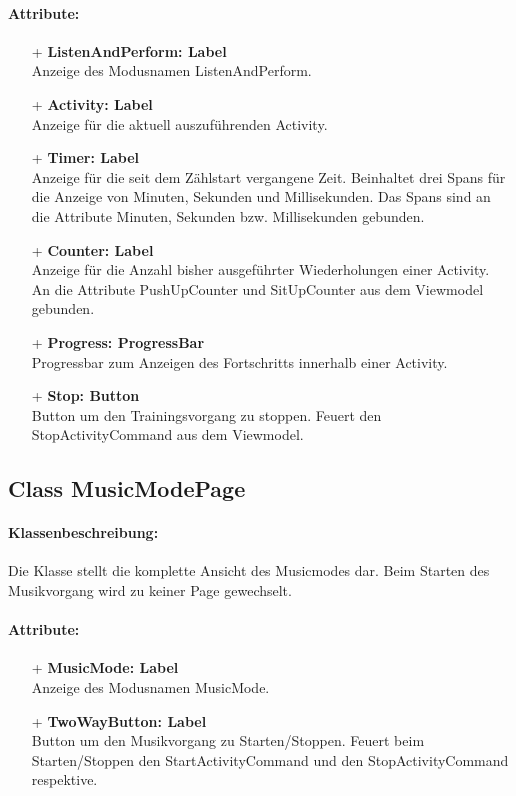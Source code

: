 \documentclass[a4paper,12pt]{article}
\begin{document}
\paragraph{Attribute:}
	\begin{itemize}
	\item[+] \textbf{ListenAndPerform: Label} \\ Anzeige des Modusnamen ListenAndPerform.
	\item[+] \textbf{Activity: Label} \\ Anzeige für die aktuell auszuführenden Activity.
	\item[+] \textbf{Timer: Label} \\ Anzeige für die seit dem Zählstart vergangene Zeit. Beinhaltet drei Spans für die Anzeige von Minuten, Sekunden und Millisekunden. Das Spans sind an die Attribute Minuten, Sekunden bzw. Millisekunden gebunden.
	\item[+] \textbf{Counter: Label} \\ Anzeige für die Anzahl bisher ausgeführter Wiederholungen einer Activity. An die Attribute PushUpCounter und SitUpCounter aus dem Viewmodel gebunden.
	\item[+] \textbf{Progress: ProgressBar} \\ Progressbar zum Anzeigen des Fortschritts innerhalb einer Activity.
	\item[+] \textbf{Stop: Button} \\ Button um den Trainingsvorgang zu stoppen. Feuert den StopActivityCommand aus dem Viewmodel.
	\end{itemize}
	
\subsection{Class MusicModePage}
\paragraph{Klassenbeschreibung:}
Die Klasse stellt die komplette Ansicht des Musicmodes dar. Beim Starten des Musikvorgang wird zu keiner Page gewechselt.
\paragraph{Attribute:}
	\begin{itemize}
	\item[+] \textbf{MusicMode: Label} \\ Anzeige des Modusnamen MusicMode.
	\item[+] \textbf{TwoWayButton: Label} \\ Button um den Musikvorgang zu Starten/Stoppen. Feuert beim Starten/Stoppen den StartActivityCommand und den StopActivityCommand respektive.
	\end{itemize}
\end{document}
